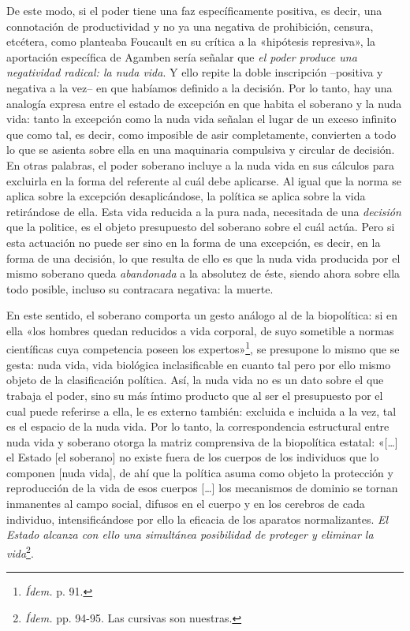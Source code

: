 De este modo, si el poder tiene una faz específicamente positiva, es decir, una connotación de productividad y no ya una negativa de prohibición, censura, etcétera, como planteaba Foucault en su crítica a la «hipótesis represiva», la aportación específica de Agamben sería señalar que \emph{el poder produce una negatividad radical: la nuda vida}. Y ello repite la doble inscripción --positiva y negativa a la vez-- en que habíamos definido a la decisión. Por lo tanto, hay una analogía expresa entre el estado de excepción en que habita el soberano y la nuda vida: tanto la excepción como la nuda vida señalan el lugar de un exceso infinito que como tal, es decir, como imposible de asir completamente, convierten a todo lo que se asienta sobre ella en una maquinaria compulsiva y circular de decisión. En otras palabras, el poder soberano incluye a la nuda vida en sus cálculos para excluirla en la forma del referente al cuál debe aplicarse. Al igual que la norma se aplica sobre la excepción desaplicándose, la política se aplica sobre la vida retirándose de ella. Esta vida reducida a la pura nada, necesitada de una \emph{decisión} que la politice, es el objeto presupuesto del soberano sobre el cuál actúa. Pero si esta actuación no puede ser sino en la forma de una excepción, es decir, en la forma de una decisión, lo que resulta de ello es que la nuda vida producida por el mismo soberano queda \emph{abandonada} a la absolutez de éste, siendo ahora sobre ella todo posible, incluso su contracara negativa: la muerte.

En este sentido, el soberano comporta un gesto análogo al de la biopolítica: si en ella «los hombres quedan reducidos a vida corporal, de suyo sometible a normas científicas cuya competencia poseen los expertos»\footnote{\emph{Ídem.} p. 91.}, se presupone lo mismo que se gesta: nuda vida, vida biológica inclasificable en cuanto tal pero por ello mismo objeto de la clasificación política. Así, la nuda vida no es un dato sobre el que trabaja el poder, sino su más íntimo producto que al ser el presupuesto por el cual puede referirse a ella, le es externo también: excluida e incluida a la vez, tal es el espacio de la nuda vida. Por lo tanto, la correspondencia estructural entre nuda vida y soberano otorga la matriz comprensiva de la biopolítica estatal: «{[}\ldots{]} el Estado {[}el soberano{]} no existe fuera de los cuerpos de los individuos que lo componen {[}nuda vida{]}, de ahí que la política asuma como objeto la protección y reproducción de la vida de esos cuerpos {[}\ldots{]} los mecanismos de dominio se tornan inmanentes al campo social, difusos en el cuerpo y en los cerebros de cada individuo, intensificándose por ello la eficacia de los aparatos normalizantes. \emph{El Estado alcanza con ello una simultánea posibilidad de proteger y eliminar la vida}\footnote{\emph{Ídem.} pp. 94-95. Las cursivas son nuestras.}.

